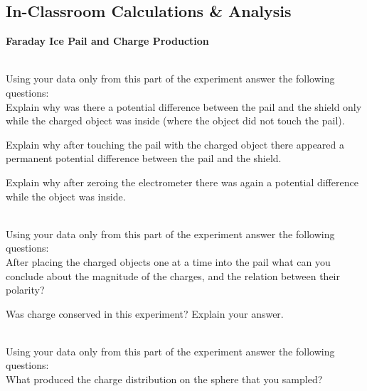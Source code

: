 {{\subsection{In-Classroom Calculations \& Analysis}
{\bf{Faraday Ice Pail and Charge Production}}\\
\vspace{0.2cm}

\\
 \noindent Using your data only from this part of the
experiment answer the following questions:\\

\noindent Explain why was there a potential difference between the
pail and the shield only while the charged object was inside
(where the object did not touch the pail).\\
\vspace{5cm}


\noindent Explain why after touching the pail with the charged
object there appeared a permanent potential difference between the pail and the shield.\\
\vspace{5cm}

\noindent Explain why after zeroing the electrometer there was
again a potential difference while the object was inside.\\
\vspace{5cm}

\\
Using your data only from this part of the experiment answer the
following questions:\\
\noindent After placing the charged objects one at a time into the
pail what can you conclude about the magnitude of the charges, and
the relation between their polarity?\\

\vspace{5cm}

\noindent Was charge conserved in this experiment? Explain your answer.\\
\vspace{4cm}

\\
\noindent Using your data only from this part of the experiment
answer the
following questions:\\
\noindent What produced the charge distribution on the sphere that
you sampled?\\
\vspace{3cm}

}}
